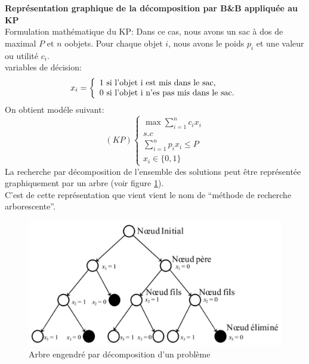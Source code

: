 \documentclass[a4paper,11pt,oneside]{report}
\theoremstyle{plain}
\newcommand{\0}{/ \! \! \! 0}
\theoremstyle{plain}
\begin{document}
{\bf Repr\'esentation graphique de la d\'ecomposition par B\&B appliqu\'ee au KP}\\
Formulation math\'ematique du KP: Dans ce cas, nous avons un sac \`a dos de maximal $P$ et $n$ oobjets. Pour chaque objet $i$, nous avons le poids $p_i$
 et une valeur ou utilit\'e $c_i$.\\
 variables de d\'ecision:
 $$
   x_i = \left \{ \begin{array}{l}
           1 \,\, \textnormal{si l'objet i est mis dans le sac,}\\
           0 \,\, \textnormal{si l'objet i n'es pas mis dans le sac.}
          \end{array}
          \right.
 $$
 On obtient mod\'ele suivant:
 $$
  (KP) \left \{\begin{array}{l}
          \max \sum_{i=1}^n c_i x_i \\
          s.c                        \\
          \sum_{i=1}^n p_i x_i \leq P \\
          x_i \in \{ 0, 1 \}
         \end{array}\right.
 $$
 La recherche par d\'ecomposition de l'ensemble des solutions peut \^etre repr\'esent\'ee graphiquement par un arbre (voir figure \ref{fig1}).\\
 C'est de cette repr\'esentation que vient vient le nom de ``m\'ethode de recherche arborescente''.
  \begin{figure}[h!]
  \begin{center}
  \includegraphics[scale=0.6]{fig1}
  \caption{\label{fig1} Arbre engendr\'e par d\'ecomposition d'un probl\`eme}
  \end{center}
  \end{figure}
\end{document}
